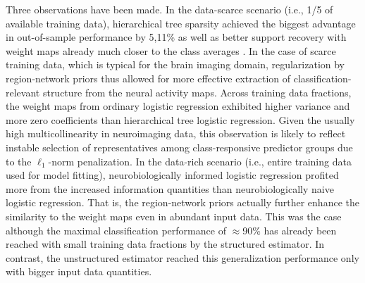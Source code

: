 \documentclass{article}
\begin{document}
Three observations have been made.
In the data-scarce scenario (i.e., 1/5 of available training data),
hierarchical tree sparsity achieved the biggest advantage
in out-of-sample performance by 5,11\% as well as
better support recovery with weight maps already much closer
to the class averages
\cite{varoquaux2012small}.
In the case of scarce training data, which is typical for the brain imaging domain,
regularization by region-network priors thus allowed for
more effective extraction of classification-relevant structure
from the neural activity maps.
%
Across training data fractions,
the weight maps from ordinary logistic regression exhibited
higher variance and more zero coefficients
than hierarchical tree logistic regression.
Given the usually high multicollinearity in neuroimaging data,
this observation is likely to reflect instable selection of
representatives among class-responsive predictor groups
due to the $\ell_1$-norm penalization.
%
In the data-rich scenario (i.e., entire training data used for model fitting),
neurobiologically informed logistic regression
profited more from the increased information quantities than
neurobiologically naive logistic regression.
That is, the region-network priors actually further enhance the similarity
to the weight maps even in abundant input data.
This was the case although
the maximal classification performance of $\approx$90\% has already
been reached with small training data fractions by the structured estimator.
In contrast, 
the unstructured estimator reached this generalization performance
only with bigger input data quantities.
%
\end{document}
